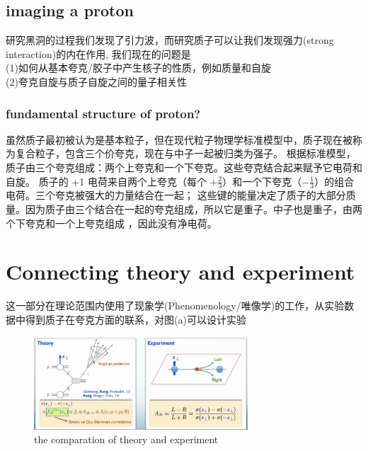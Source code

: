 \documentclass[12pt, a4paper, oneside]{ctexart}
\begin{document}
\begin{spacing}{2.0}
\subsection{imaging a proton}
研究黑洞的过程我们发现了引力波，而研究质子可以让我们发现强力(strong interaction)的内在作用,
我们现在的问题是\\
(1)如何从基本夸克/胶子中产生核子的性质，例如质量和自旋\\
(2)夸克自旋与质子自旋之间的量子相关性
\subsubsection{fundamental structure of proton?}
虽然质子最初被认为是基本粒子，但在现代粒子物理学标准模型中，质子现在被称为复合粒子，包含三个价夸克，现在与中子一起被归类为强子。
根据标准模型，质子由三个夸克组成：两个上夸克和一个下夸克。这些夸克结合起来赋予它电荷和自旋。
质子的 +1 电荷来自两个上夸克（每个 $+\frac{2}{3}$）和一个下夸克（$-\frac{1}{3}$）的组合电荷。三个夸克被强大的力量结合在一起； 
这些键的能量决定了质子的大部分质量。因为质子由三个结合在一起的夸克组成，所以它是重子。中子也是重子，由两个下夸克和一个上夸克组成
，因此没有净电荷。

\section{Connecting theory and experiment}
这一部分在理论范围内使用了现象学(Phenomenology/唯像学)的工作，从实验数据中得到质子在夸克方面的联系，对图(a)可以设计实验

\begin{figure}
    \centering
    \includegraphics[width=8cm]{theory and experiment.jpg}
    \caption{the comparation of theory and experiment}
\end{figure}



\end{spacing}
\end{document}
